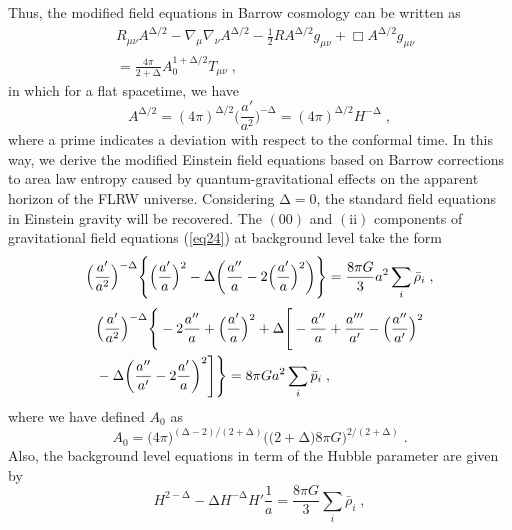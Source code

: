 \documentclass[11pt,twocolumn]{article}
\begin{document}
Thus, the modified field equations in Barrow cosmology can be
written as
\begin{align} \label{eq24}
&R_{\mu \nu} A^{\mathrm{\Delta}/2}-\nabla_{\mu} \nabla_{\nu}
A^{\mathrm{\Delta}/2}-\frac{1}{2} R A^{\mathrm{\Delta}/2} g_{\mu \nu}+\Box
A^{\mathrm{\Delta}/2} g_{\mu \nu} \nonumber \\
&=\frac{4\pi}{2+\mathrm{\Delta}}A_0^{1+\mathrm{\Delta}/2}T_{\mu \nu} \;,
\end{align}
in which for a flat spacetime, we have
\begin{equation} \label{eq25}
A^{\mathrm{\Delta}/2}=(4\pi)^{\mathrm{\Delta}/2}
\Big(\frac{a'}{a^2}\Big)^{-\mathrm{\Delta}}=(4\pi)^{\mathrm{\mathrm{\Delta}}/2} H^{-\mathrm{\mathrm{\Delta}}}
\;,
\end{equation}
where a prime indicates a deviation with respect to the conformal
time. In this way, we
derive the modified Einstein field equations based on Barrow
corrections to area law entropy caused by quantum-gravitational
effects on the apparent horizon of the FLRW universe. Considering
$\mathrm{\Delta}=0$, the standard field equations in Einstein gravity will
be recovered. The $(00)$ and $(\mathrm{ii})$ components of gravitational
field equations (\ref{eq24}) at background level take the form
    \begin{equation} \label{eq26}
    \Big(\frac{a'}{a^2}\Big)^{-\mathrm{\Delta}}\Bigg{\{}\Big(\frac{a'}{a}\Big)^2-\mathrm{\Delta}\bigg(\frac{a''}{a}-2\Big(\frac{a'}{a}\Big)^2\bigg)\Bigg{\}}=\frac{8\pi G}{3} a^2 \sum_{i}\bar{\rho}_i \;,
    \end{equation}
    \begin{align} \label{eq27}
    &\Big(\frac{a'}{a^2}\Big)^{-\mathrm{\Delta}}\Bigg{\{}-2\frac{a''}{a}+\Big(\frac{a'}{a}\Big)^2+\mathrm{\Delta}\Bigg[-\frac{a''}{a}+\frac{a'''}{a'}-\Big(\frac{a''}{a'}\Big)^2 \nonumber \\
    &-\mathrm{\Delta}\bigg(\frac{a''}{a'}-2\frac{a'}{a}\bigg)^2\Bigg]\Bigg{\}}=8\pi G a^2 \sum_{i}\bar{p}_i \;,
    \end{align}
where we have defined $A_0$ as
    \begin{equation*}
    A_0=\big(4\pi\big)^{(\mathrm{\Delta}-2)/(2+\mathrm{\Delta})}\Big(\big(2+\mathrm{\Delta}\big)8\pi G\Big)^{2/(2+\mathrm{\Delta})} \;.
    \end{equation*}
Also, the background level equations in term of the Hubble parameter are
given by
    \begin{equation} \label{eq28}
    H^{2-\mathrm{\Delta}}-\mathrm{\Delta} H^{-\mathrm{\Delta}} H' \frac{1}{a}=\frac{8\pi G}{3} \sum_{i}\bar{\rho}_i \;,
    \end{equation}
\end{document}
